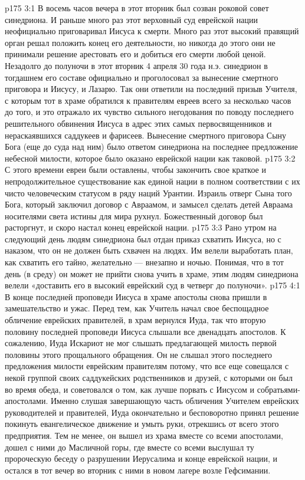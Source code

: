 \vs p175 3:1 В восемь часов вечера в этот вторник был созван роковой совет синедриона. И раньше много раз этот верховный суд еврейской нации неофициально приговаривал Иисуса к смерти. Много раз этот высокий правящий орган решал положить конец его деятельности, но никогда до этого они не принимали решение арестовать его и добиться его смерти любой ценой. Незадолго до полуночи в этот вторник 4 апреля 30 года н.э. синедрион в тогдашнем его составе официально и  проголосовал за вынесение смертного приговора и Иисусу, и Лазарю. Так они ответили на последний призыв Учителя, с которым тот в храме обратился к правителям евреев всего за несколько часов до того, и это отражало их чувство сильного негодования по поводу последнего решительного обвинения Иисуса в адрес этих самых первосвященников и нераскаявшихся саддукеев и фарисеев. Вынесение смертного приговора Сыну Бога (еще до суда над ним) было ответом синедриона на последнее предложение небесной милости, которое было оказано еврейской нации как таковой.
\vs p175 3:2 С этого времени евреи были оставлены, чтобы закончить свое краткое и непродолжительное существование как единой нации в полном соответствии с их чисто человеческим статусом в ряду наций Урантии. Израиль отверг Сына того Бога, который заключил договор с Авраамом, и замысел сделать детей Авраама носителями света истины для мира рухнул. Божественный договор был расторгнут, и скоро настал конец еврейской нации.
\vs p175 3:3 Рано утром на следующий день людям синедриона был отдан приказ схватить Иисуса, но с наказом, что он не должен быть схвачен на людях. Им велели выработать план, как схватить его тайно, желательно --- внезапно и ночью. Понимая, что в тот день (в среду) он может не прийти снова учить в храме, этим людям синедриона велели «доставить его в высокий еврейский суд в четверг до полуночи».
\vs p175 4:1 В конце последней проповеди Иисуса в храме апостолы снова пришли в замешательство и ужас. Перед тем, как Учитель начал свое беспощадное обличение еврейских правителей, в храм вернулся Иуда, так что вторую половину последней проповеди Иисуса слышали все двенадцать апостолов. К сожалению, Иуда Искариот не мог слышать предлагающей милость первой половины этого прощального обращения. Он не слышал этого последнего предложения милости еврейским правителям потому, что все еще совещался с некой группой своих саддукейских родственников и друзей, с которыми он был во время обеда, и советовался о том, как лучше порвать с Иисусом и собратьями\hyp{}апостолами. Именно слушая завершающую часть обличения Учителем еврейских руководителей и правителей, Иуда окончательно и бесповоротно принял решение покинуть евангелическое движение и умыть руки, отрекшись от всего этого предприятия. Тем не менее, он вышел из храма вместе со всеми апостолами, дошел с ними до Масличной горы, где вместе со всеми выслушал ту пророческую беседу о разрушении Иерусалима и конце еврейской нации, и остался в тот вечер во вторник с ними в новом лагере возле Гефсимании.
